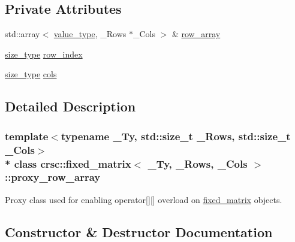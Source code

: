 \subsection*{Private Attributes}
\begin{DoxyCompactItemize}
\item 
std\+::array$<$ \hyperlink{classcrsc_1_1fixed__matrix_a1d0717197dc43f3752d508763a8b5a9e}{value\+\_\+type}, \+\_\+\+Rows $\ast$\+\_\+\+Cols $>$ \& \hyperlink{classcrsc_1_1fixed__matrix_1_1proxy__row__array_a6a41ce5685b40e0bb1b35f99298a9d9b}{row\+\_\+array}
\item 
\hyperlink{classcrsc_1_1fixed__matrix_a4f4ba9cbd0e0723193df4c8281ddd99b}{size\+\_\+type} \hyperlink{classcrsc_1_1fixed__matrix_1_1proxy__row__array_a397eeeb06f56487a8923d6eb4a220235}{row\+\_\+index}
\item 
\hyperlink{classcrsc_1_1fixed__matrix_a4f4ba9cbd0e0723193df4c8281ddd99b}{size\+\_\+type} \hyperlink{classcrsc_1_1fixed__matrix_1_1proxy__row__array_a18e4e3a22600581c6a8c7a667b653816}{cols}
\end{DoxyCompactItemize}


\subsection{Detailed Description}
\subsubsection*{template$<$typename \+\_\+\+Ty, std\+::size\+\_\+t \+\_\+\+Rows, std\+::size\+\_\+t \+\_\+\+Cols$>$\\*
class crsc\+::fixed\+\_\+matrix$<$ \+\_\+\+Ty, \+\_\+\+Rows, \+\_\+\+Cols $>$\+::proxy\+\_\+row\+\_\+array}

Proxy class used for enabling operator\mbox{[}\mbox{]}\mbox{[}\mbox{]} overload on \hyperlink{classcrsc_1_1fixed__matrix}{fixed\+\_\+matrix} objects. 

\subsection{Constructor \& Destructor Documentation}
